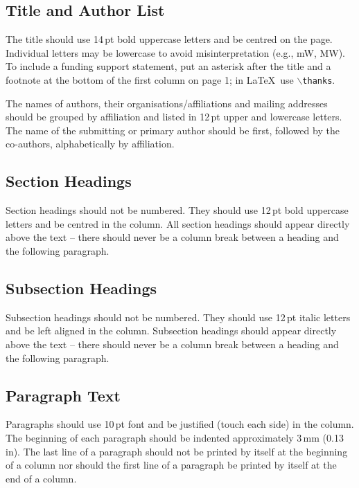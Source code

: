 \documentclass{JAC2003}
\begin{document}
\subsection{Title and Author List}

The title should use 14\,pt bold uppercase letters and be centred on the page.
Individual letters may be lowercase to avoid misinterpretation (e.g., mW, MW).
To include a funding support statement, put an asterisk after the title and a
footnote at the bottom of the first column on page 1; in \LaTeX\ use
$\backslash$\texttt{thanks}.
  
The names of authors, their organisations/affiliations and mailing addresses 
should be grouped by affiliation and listed in 12\,pt upper and lowercase letters.
The name of the submitting or primary author should be first, followed by 
the co-authors, alphabetically by affiliation.


\subsection{Section Headings}

Section headings should not be numbered. They should
use  12\,pt  bold  uppercase  letters  and  be  centred  in  the
column. All section headings should appear directly above
the text -- there should never be a column break between a heading and the
following paragraph.

\subsection{Subsection Headings}

Subsection  headings  should  not  be  numbered.  They
should use 12\,pt italic letters and be left aligned in the
column. Subsection headings should appear
directly above the text -- there should never be a column break between a
heading and the following paragraph.

\subsection{Paragraph Text}

Paragraphs should use 10\,pt font and be justified (touch each side) in
the column. The beginning of each paragraph should be indented
approximately 3\,mm (0.13\,in). The last line of a paragraph should not be
printed by itself at the beginning of a column nor should the first line of
a paragraph be printed by itself at the end of a column.
\end{document}
